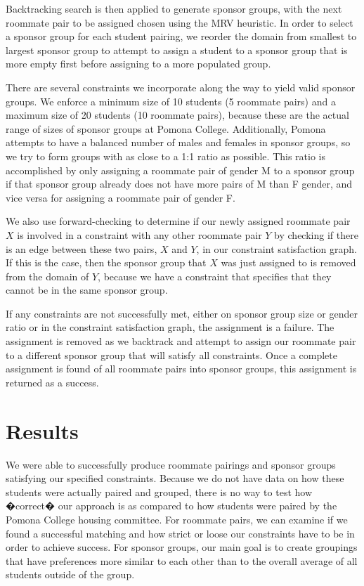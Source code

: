 \documentclass[letterpaper]{article}
\begin{document}
Backtracking search is then applied to generate sponsor groups, with the next roommate pair to be assigned chosen using the MRV heuristic. In order to select a sponsor group for each student pairing, we reorder the domain from smallest to largest sponsor group to attempt to assign a student to a sponsor group that is more empty first before assigning to a more populated group.

There are several constraints we incorporate along the way to yield valid sponsor groups. We enforce a minimum size of 10 students (5 roommate pairs) and a maximum size
of 20 students (10 roommate pairs), because these are the actual range of sizes of sponsor groups at Pomona College. Additionally, Pomona attempts to have a balanced number of males and females in sponsor groups, so we try to form groups with as close to a 1:1 ratio as possible. This ratio is accomplished by only assigning a roommate pair of gender M to a sponsor group if that sponsor group already does not have more pairs of M than F gender, and vice versa for assigning a roommate pair of gender F.

We also use forward-checking to determine if our newly assigned roommate pair $X$ is involved in a constraint with any other roommate pair $Y$ by checking if there is an edge between these two pairs, $X$ and $Y$, in our constraint satisfaction graph. If this is the case, then the sponsor group that $X$ was just assigned to is removed from the domain of $Y$, because we have a constraint that specifies that they cannot be in the same sponsor group.

If any constraints are not successfully met, either on sponsor group size or gender ratio or in the constraint satisfaction graph, the assignment is a failure. The assignment is removed as we backtrack and attempt to assign our roommate pair to a different sponsor group that will satisfy all constraints. Once a complete assignment is found of all roommate pairs into sponsor groups, this assignment is returned as a success.

\section{Results}
We were able to successfully produce roommate pairings and sponsor groups satisfying our specified constraints. Because we do not have data on how these students were actually paired and grouped, there is no way to test how �correct� our approach is as compared to how students were paired by the Pomona College housing committee. For roommate pairs, we can examine if we found a successful matching and how strict or loose our constraints have to be in order to achieve success. For sponsor groups, our main goal is to create groupings that have preferences more similar to each other than to the overall average of all students outside of the group.
\end{document}
